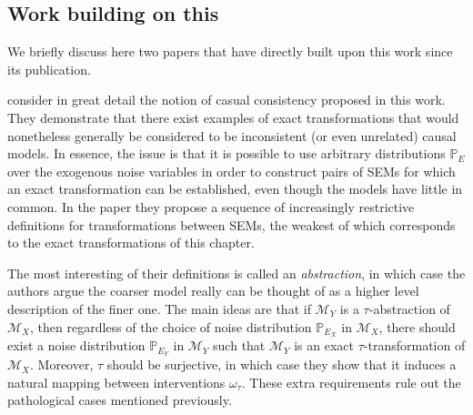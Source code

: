 \subsection{Work building on this}

We briefly discuss here two papers that have directly built upon this work since its publication. 


\cite{sanders1} consider in great detail the notion of casual consistency proposed in this work. 
They demonstrate that there exist examples of exact transformations that would nonetheless generally be considered to be inconsistent (or even unrelated) causal models. 
In essence, the issue is that it is possible to use arbitrary distributions $\mathbb{P}_E$ over the exogenous noise variables in order to construct pairs of SEMs for which an exact transformation can be established, even though the models have little in common.
In the paper they propose a sequence of increasingly restrictive definitions for transformations between SEMs, the weakest of which corresponds to the exact transformations of this chapter.

The most interesting of their definitions is called an \emph{abstraction}, in which case the authors argue the coarser model really can be thought of as a higher level description of the finer one. 
The main ideas are that if $\mathcal{M}_Y$ is a $\tau$-abstraction of $\mathcal{M}_X$, then regardless of the choice of noise distribution $\mathbb{P}_{E_X}$ in $\mathcal{M}_X$, there should exist a noise distribution $\mathbb{P}_{E_Y}$ in $\mathcal{M}_Y$ such that $\mathcal{M}_Y$ is an exact $\tau$-transformation of $\mathcal{M}_X$. 
Moreover, $\tau$ should be surjective, in which case they show that it induces a natural mapping between interventions $\omega_\tau$.
These extra requirements rule out the pathological cases mentioned previously.

